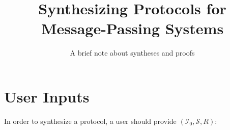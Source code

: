 \documentclass[format=manuscript]{acmart}
\begin{document}
\title{Synthesizing Protocols for Message-Passing Systems}
\subtitle{A brief note about syntheses and proofs}

\makeatletter
\renewcommand\@formatdoi[1]{\ignorespaces}
\makeatother

\maketitle


\newcommand{\valOf}[1]{\ensuremath{#1.\texttt{v}}}
\newcommand{\stOf}[1]{\ensuremath{#1.\texttt{st}}}
\newcommand{\trsOf}[1]{\ensuremath{#1.\texttt{trs}}}
\newcommand{\trsYes}{\ensuremath{\top}}
\newcommand{\trsNo}{\ensuremath{\bot}}

\newcommand{\objGetRq}[1]{\ensuremath{#1.\texttt{getRq()}}}
\newcommand{\objGetRs}[2]{\ensuremath{#1:\texttt{getRs(}#2\texttt{)}}}
\newcommand{\objSetRq}[2]{\ensuremath{#1.\texttt{setRq(}#2\texttt{)}}}
\newcommand{\objSetRs}[1]{\ensuremath{#1:\texttt{setRs()}}}

\newcommand{\intSetRq}[2]{\ensuremath{#1 \leadsto #2.\texttt{setRq()}}}
\newcommand{\intSetRs}[2]{\ensuremath{#1 \leadsto #2.\texttt{setRs()}}}
\newcommand{\intInvRq}[2]{\ensuremath{#1 \leadsto #2.\texttt{invRq()}}}
\newcommand{\intInvRs}[2]{\ensuremath{#1 \leadsto #2.\texttt{invRs()}}}

\newcommand{\msgrule}[4]{\ensuremath{#1\vdash \{ #2 \} \xrightarrow{#3} \{ #4 \}}}

\newcommand{\refSec}[1]{[Section~\ref{#1}]}
\newcommand{\refInv}[1]{[Invariant~\ref{#1}]}
\newcommand{\refTrs}[1]{[Transition~\ref{#1}]}
\newcommand{\refFig}[1]{[Figure~\ref{#1}]}

\newcommand{\eg}{\emph{e.g.}}
\newcommand{\ie}{\emph{i.e.}}

\section{User Inputs}

In order to synthesize a protocol, a user should provide $(\mathcal{I}_0,
\mathcal{S}, R)$:
\end{document}
